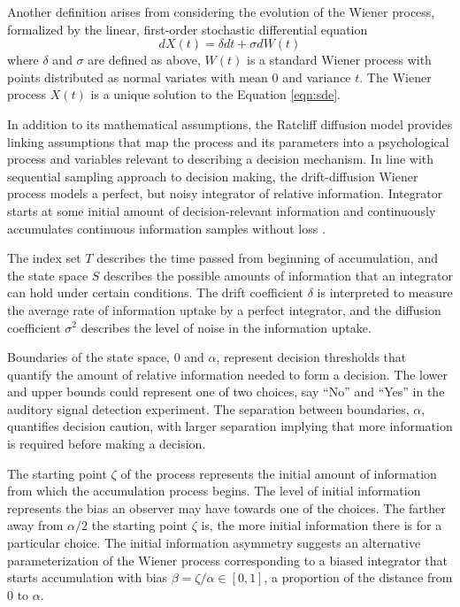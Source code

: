 \documentclass[12pt]{article}
\begin{document}
Another definition arises from considering the evolution of the Wiener process,
formalized by the linear, first-order stochastic  differential equation 
% 
\begin{equation}
\label{eqn:sde}
dX(t) = \delta dt + \sigma dW(t) 
\end{equation} 
% 
where $\delta$ and $\sigma$ are defined as above, $W(t)$ is a
standard Wiener process with points distributed as normal
variates with mean 0 and variance $t$. The Wiener process $X(t)$ is a unique solution to the Equation \ref{eqn:sde}.

In addition to its mathematical assumptions, the Ratcliff
diffusion model provides linking assumptions that
map the process and its parameters into a psychological process and variables relevant to describing a decision mechanism. In line with sequential sampling approach to decision making, the drift-diffusion Wiener process models a perfect, but noisy integrator of relative information. Integrator starts at some initial amount of decision-relevant information and continuously accumulates continuous information samples without loss \citep{Smi2000,BogBro2006}. 

The index set $T$ describes the time passed from beginning of accumulation, and the state space $S$ describes the possible amounts of information that an integrator can hold under certain conditions.  The drift coefficient $\delta$ is interpreted  to measure the average rate of information uptake by a perfect integrator, and the
diffusion coefficient $\sigma^2$ describes the level of noise in
the information uptake. 

Boundaries of
the state space, 0 and $\alpha$, represent decision thresholds that quantify the amount of relative information
needed to form a decision. The lower and upper bounds
could represent one of two
choices, say ``No'' and ``Yes'' in the auditory signal detection
experiment.  The separation between boundaries, $\alpha$, quantifies decision
caution, with larger separation implying that more
information is required before making a decision.
    
The starting point $\zeta$ of the process represents the initial
amount of information from which the accumulation process
begins. The level of initial information represents the bias an
observer may have towards one of the choices. The farther away from $\alpha / 2$ the starting point $\zeta$ is, the more initial information there is for a particular choice. The initial information asymmetry suggests an alternative parameterization of the Wiener process corresponding to a biased integrator that starts accumulation with bias $\beta = \zeta / \alpha \in [0, 1]$, a proportion of the distance from 0 to $\alpha$.
    
\end{document}
